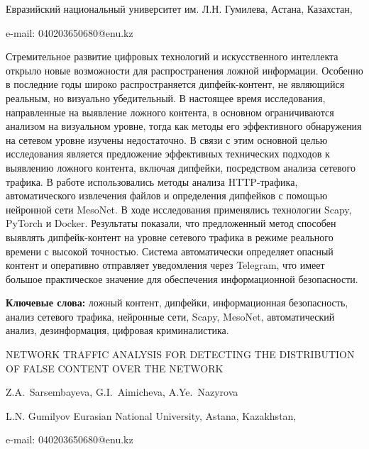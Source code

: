 \begin{affil}
Евразийский национальный университет им. Л.Н. Гумилева, Астана, Казахстан,

e-mail: 040203650680@enu.kz
\end{affil}

Стремительное развитие цифровых технологий и искусственного интеллекта
открыло новые возможности для распространения ложной информации.
Особенно в последние годы широко распространяется дипфейк-контент, не
являющийся реальным, но визуально убедительный. В настоящее время
исследования, направленные на выявление ложного контента, в основном
ограничиваются анализом на визуальном уровне, тогда как методы его
эффективного обнаружения на сетевом уровне изучены недостаточно. В связи
с этим основной целью исследования является предложение эффективных
технических подходов к выявлению ложного контента, включая дипфейки,
посредством анализа сетевого трафика. В работе использовались методы
анализа HTTP-трафика, автоматического извлечения файлов и определения
дипфейков с помощью нейронной сети MesoNet. В ходе исследования
применялись технологии Scapy, PyTorch и Docker. Результаты показали, что
предложенный метод способен выявлять дипфейк-контент на уровне сетевого
трафика в режиме реального времени с высокой точностью. Система
автоматически определяет опасный контент и оперативно отправляет
уведомления через Telegram, что имеет большое практическое значение для
обеспечения информационной безопасности.

{\bfseries Ключевые слова:} ложный контент, дипфейки, информационная
безопасность, анализ сетевого трафика, нейронные сети, Scapy, MesoNet,
автоматический анализ, дезинформация, цифровая криминалистика.
\vspace{1em}
\begin{header}
NETWORK TRAFFIC ANALYSIS FOR DETECTING THE DISTRIBUTION OF FALSE CONTENT OVER THE NETWORK

Z.A.~Sarsembayeva\envelope,
G.I.~Aimicheva,
A.Ye.~Nazyrova
\end{header}

\begin{affil}
L.N. Gumilyov Eurasian National University, Astana, Kazakhstan,

e-mail: 040203650680@enu.kz
\end{affil}

